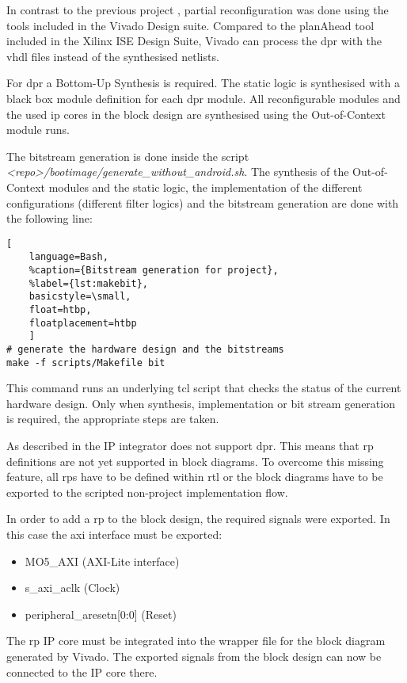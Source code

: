 In contrast to the previous project \cite{oldrepo}, partial reconfiguration was done using the tools included in the Vivado Design suite. Compared to the planAhead tool included in the Xilinx ISE Design Suite, Vivado can process the \gls{dpr} with the \gls{vhdl} files instead of the synthesised netlists.

For \gls{dpr} a Bottom-Up Synthesis is required. The static logic is synthesised with a black box module definition for each \gls{dpr} module. All reconfigurable modules and the used ip cores in the block design are synthesised using the Out-of-Context module runs.

The bitstream generation is done inside the script\\\emph{<repo>/bootimage/generate\_without\_android.sh}. The synthesis of the Out-of-Context modules and the static logic, the implementation of the different configurations (different filter logics) and the bitstream generation are done with the following line:

\begin{lstlisting}[
	language=Bash,
	%caption={Bitstream generation for project},
	%label={lst:makebit},
	basicstyle=\small,
	float=htbp,
	floatplacement=htbp
	]
# generate the hardware design and the bitstreams
make -f scripts/Makefile bit
\end{lstlisting}
\FloatBarrier

This command runs an underlying \gls{tcl} script that checks the status of the current hardware design. Only when synthesis, implementation or bit stream generation is required, the appropriate steps are taken.

As described in \cite{UG909} the IP integrator does not support \gls{dpr}. This means that \gls{rp} definitions are not yet supported in block diagrams. To overcome this missing feature, all \glspl{rp} have to be defined within \gls{rtl} or the block diagrams have to be exported to the scripted non-project implementation flow. 

In order to add a \gls{rp} to the block design, the required signals were exported. In this case the \gls{axi} interface must be exported:
\begin{itemize}
    \item MO5\_AXI (AXI-Lite interface)
    \item s\_axi\_aclk (Clock)
    \item peripheral\_aresetn[0:0] (Reset)
\end{itemize}

The \gls{rp} IP core must be integrated into the wrapper file for the block diagram generated by Vivado. The exported signals from the block design can now be connected to the IP core there.

